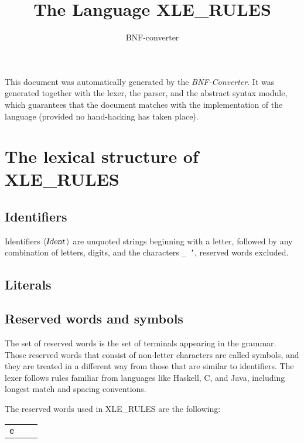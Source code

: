 \documentclass[a4paper,11pt]{article}
\author{BNF-converter}
\title{The Language XLE_RULES}
\begin{document}
\maketitle

\newcommand{\emptyP}{\mbox{$\epsilon$}}
\newcommand{\terminal}[1]{\mbox{{\texttt {#1}}}}
\newcommand{\nonterminal}[1]{\mbox{$\langle \mbox{{\sl #1 }} \! \rangle$}}
\newcommand{\arrow}{\mbox{::=}}
\newcommand{\delimit}{\mbox{$|$}}
\newcommand{\reserved}[1]{\mbox{{\texttt {#1}}}}
\newcommand{\literal}[1]{\mbox{{\texttt {#1}}}}
\newcommand{\symb}[1]{\mbox{{\texttt {#1}}}}

This document was automatically generated by the {\em BNF-Converter}. It was generated together with the lexer, the parser, and the abstract syntax module, which guarantees that the document matches with the implementation of the language (provided no hand-hacking has taken place).

\section*{The lexical structure of XLE_RULES}
\subsection*{Identifiers}
Identifiers \nonterminal{Ident} are unquoted strings beginning with a letter,
followed by any combination of letters, digits, and the characters {\tt \_ '},
reserved words excluded.


\subsection*{Literals}



\subsection*{Reserved words and symbols}
The set of reserved words is the set of terminals appearing in the grammar. Those reserved words that consist of non-letter characters are called symbols, and they are treated in a different way from those that are similar to identifiers. The lexer follows rules familiar from languages like Haskell, C, and Java, including longest match and spacing conventions.

The reserved words used in XLE_RULES are the following: \\

\begin{tabular}{lll}
{\reserved{e}} & & \\
\end{tabular}\\
\end{document}
